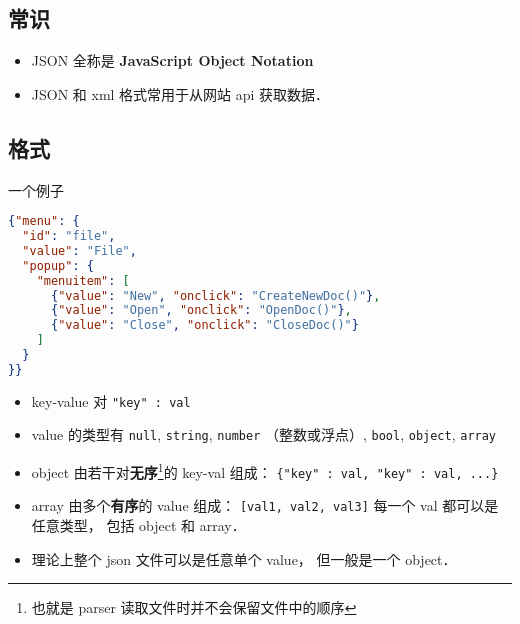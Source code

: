 
\begin{issues}
\issueDraft
\end{issues}

\subsection{常识}
\begin{itemize}
\item JSON 全称是 \textbf{JavaScript Object Notation}
\item JSON 和 xml 格式常用于从网站 api 获取数据．
\end{itemize}

\subsection{格式}
一个例子
\begin{lstlisting}[language=json]
{"menu": {
  "id": "file",
  "value": "File",
  "popup": {
    "menuitem": [
      {"value": "New", "onclick": "CreateNewDoc()"},
      {"value": "Open", "onclick": "OpenDoc()"},
      {"value": "Close", "onclick": "CloseDoc()"}
    ]
  }
}}
\end{lstlisting}

\begin{itemize}
\item key-value 对 \verb|"key" : val|
\item value 的类型有 \verb|null|, \verb|string|, \verb|number| （整数或浮点）, \verb|bool|, \verb|object|, \verb|array|
\item object 由若干对\textbf{无序}\footnote{也就是 parser 读取文件时并不会保留文件中的顺序}的 key-val 组成： \verb|{"key" : val, "key" : val, ...}|
\item array 由多个\textbf{有序}的 value 组成： \verb|[val1, val2, val3]| 每一个 val 都可以是任意类型， 包括 object 和 array．
\item 理论上整个 json 文件可以是任意单个 value， 但一般是一个 object．
\end{itemize}
